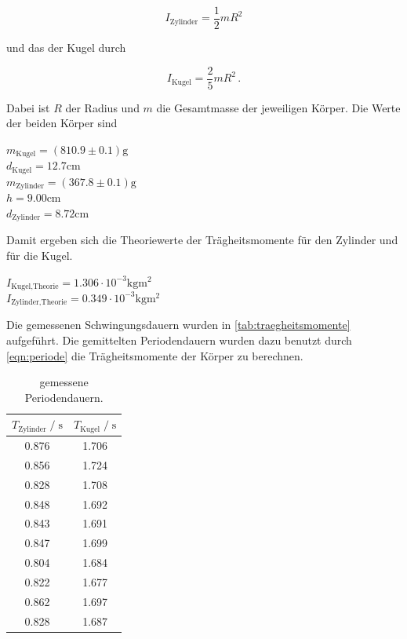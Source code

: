 \begin{equation}
  I_{\text{Zylinder}} = \frac{1}{2} mR^2
\end{equation}

und das der Kugel durch

\begin{equation}
  I_{\text{Kugel}} = \frac{2}{5} mR^2 \, .
\end{equation}

Dabei ist $R$ der Radius und $m$ die Gesamtmasse der jeweiligen Körper.
Die Werte der beiden Körper sind

\begin{center}
  $m_{\text{Kugel}} = (810.9 \pm 0.1)\si{\gram}$ \\
  $d_{\text{Kugel}} = 12.7\si{\centi\meter}$ \\
  $m_{\text{Zylinder}} = (367.8\pm 0.1)\si{\gram}$ \\
  $h = 9.00 \si{\centi\meter}$ \\
  $d_{\text{Zylinder}} = 8.72 \si{\centi\meter}$ \\
\end{center}


Damit ergeben sich die Theoriewerte der Trägheitsmomente für den Zylinder und für die Kugel.

\begin{center}
  $I_{\text{Kugel,Theorie}} = 1.306 \cdot 10^{-3} \si{\kilogram\meter^2}$ \\
  $I_{\text{Zylinder,Theorie}} = 0.349 \cdot 10^{-3} \si{\kilogram\meter^2}$ \\
\end{center}


Die gemessenen Schwingungsdauern wurden in \autoref{tab:traegheitsmomente} aufgeführt. Die gemittelten Periodendauern wurden dazu benutzt
durch \autoref{eqn:periode} die Trägheitsmomente der Körper zu berechnen.

\begin{table}[H]
  \centering
   \caption{gemessene Periodendauern.}
   \label{tab:traegheitsmomente}
   \begin{tabular}{c c}
      \toprule
      $ T_{\text{Zylinder}} \;/\; \si{\second}$ & $ T_{\text{Kugel}} \;/\; \si{\second}$ \\
      \midrule
      0.876 & 1.706 \\
      0.856 & 1.724 \\
      0.828 & 1.708 \\
      0.848 & 1.692 \\
      0.843 & 1.691 \\
      0.847 & 1.699 \\
      0.804 & 1.684 \\
      0.822 & 1.677 \\
      0.862 & 1.697 \\
      0.828 & 1.687 \\
      \bottomrule
   \end{tabular}
\end{table}

